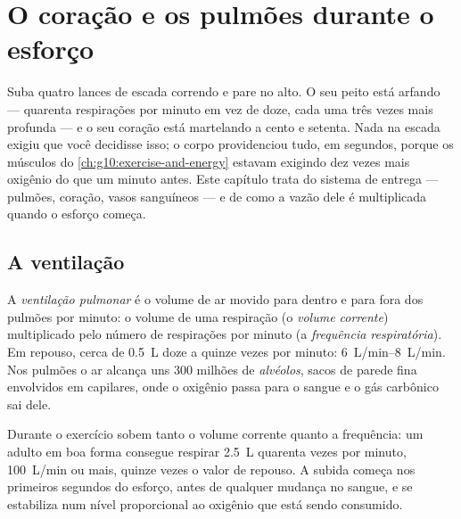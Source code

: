 \chapter{O coração e os pulmões durante o esforço}\label{ch:g10:heart-lungs-effort}

Suba quatro lances de escada correndo e pare no alto. O seu peito está
arfando --- quarenta respirações por minuto em vez de doze, cada uma
três vezes mais profunda --- e o seu coração está martelando a cento e
setenta. Nada na escada exigiu que você decidisse isso; o corpo
providenciou tudo, em segundos, porque os músculos do
\cref{ch:g10:exercise-and-energy} estavam exigindo dez vezes mais
oxigênio do que um minuto antes. Este capítulo trata do sistema de
entrega --- pulmões, coração, vasos sanguíneos --- e de como a vazão
dele é multiplicada quando o esforço começa.

\section{A ventilação}

\begin{definition}[Ventilação]\label{def:g10:heart-lungs-effort:ventilation}
A \emph{ventilação pulmonar} é o volume de ar movido
para dentro e para fora dos pulmões por minuto: o volume de uma
respiração (o \emph{volume corrente}) multiplicado pelo número de
respirações por minuto (a \emph{frequência respiratória}). Em repouso,
cerca de \qty{0.5}{L} doze a quinze vezes por minuto:
\qtyrange{6}{8}{L/min}. Nos pulmões o ar alcança uns 300 milhões de
\emph{alvéolos}, sacos de parede fina envolvidos em
capilares, onde o oxigênio passa para o sangue e o gás carbônico sai
dele.
\end{definition}

\begin{proposition}\label{prop:g10:heart-lungs-effort:vent-exercise}
Durante o exercício sobem tanto o volume corrente quanto a frequência:
um adulto em boa forma consegue respirar \qty{2.5}{L} quarenta vezes
por minuto, \qty{100}{L/min} ou mais, quinze vezes o valor de repouso. A
subida começa nos primeiros segundos do esforço, antes de qualquer
mudança no sangue, e se estabiliza num nível proporcional ao oxigênio
que está sendo consumido.
\end{proposition}
\admitted

